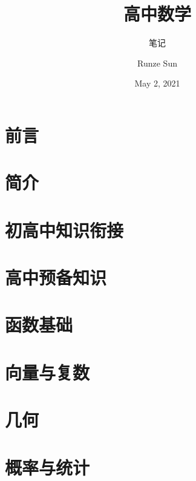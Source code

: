 \documentclass[cn,10pt,math=newtx,citestyle=gb7714-2015,bibstyle=gb7714-2015]{elegantbook}
\title{高中数学}
\subtitle{笔记}
\author{Runze Sun}
\institute{LearAwesome}
\date{May 2, 2021}
\begin{document}
\maketitle
\frontmatter

\chapter*{前言}


\newpage
\chapter*{简介}



\tableofcontents

\mainmatter

\chapter{初高中知识衔接}


\chapter{高中预备知识}


\chapter{函数基础}


\chapter{向量与复数}


\chapter{几何}


\chapter{概率与统计}

\end{document}
